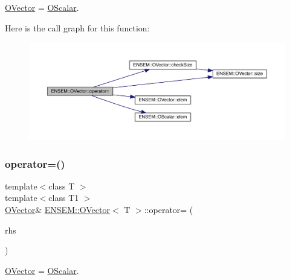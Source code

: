 \mbox{\hyperlink{classENSEM_1_1OVector}{O\+Vector}} = \mbox{\hyperlink{classENSEM_1_1OScalar}{O\+Scalar}}. 

Here is the call graph for this function\+:
\nopagebreak
\begin{figure}[H]
\begin{center}
\leavevmode
\includegraphics[width=350pt]{d0/d8d/classENSEM_1_1OVector_a31b08dda73879d2a39c4a0bec90bc401_cgraph}
\end{center}
\end{figure}
\mbox{\label{classENSEM_1_1OVector_a31b08dda73879d2a39c4a0bec90bc401}} 
\subsubsection{\texorpdfstring{operator=()}{operator=()}\hspace{0.1cm}{\footnotesize\ttfamily [5/12]}}
{\footnotesize\ttfamily template$<$class T $>$ \\
template$<$class T1 $>$ \\
\mbox{\hyperlink{classENSEM_1_1OVector}{O\+Vector}}\& \mbox{\hyperlink{classENSEM_1_1OVector}{E\+N\+S\+E\+M\+::\+O\+Vector}}$<$ T $>$\+::operator= (\begin{DoxyParamCaption}\item[{const \mbox{\hyperlink{classENSEM_1_1OScalar}{O\+Scalar}}$<$ T1 $>$ \&}]{rhs }\end{DoxyParamCaption})\hspace{0.3cm}{\ttfamily [inline]}}



\mbox{\hyperlink{classENSEM_1_1OVector}{O\+Vector}} = \mbox{\hyperlink{classENSEM_1_1OScalar}{O\+Scalar}}. 

